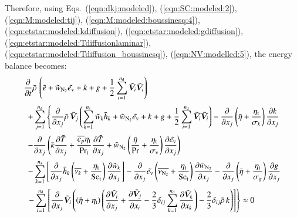 \documentclass{warpdoc}
\newcommand{\alb}{\vspace{0.2cm}\\} %
\newcommand{\Cp}{{c_{p}}}
\newcommand{\Sct}{{{\rm Sc}_{\rm t}}}
\newcommand{\Prt}{{{\rm Pr}_{\rm t}}}
\newcommand{\nd}{{{n}_{\rm d}}}
\newcommand{\ns}{{{n}_{\rm s}}}
\newcommand{\turb}{_{\rm t}}
\newcommand{\etat}{{\eta\turb}}
\newcommand{\mfd}{\displaystyle}
\newcommand{\ev}{e_{\rm v}}
\newcommand{\sigmav}{\sigma_{\rm v}}
\begin{document}
Therefore, using Eqs.\ (\ref{eqn:dkj:modeled}), (\ref{eqn:SC:modeled:2}),
(\ref{eqn:M:modeled:tij}), (\ref{eqn:M:modeled:boussinesq:4}), (\ref{eqn:etstar:modeled:kdiffusion}),
(\ref{eqn:etstar:modeled:gdiffusion}), (\ref{eqn:etstar:modeled:Tdiffusionlaminar}),
(\ref{eqn:etstar:modeled:Tdiffusion_boussinesq}), (\ref{eqn:NV:modelled:5}),  the energy balance becomes:
%
\begin{equation}
 \begin{array}{l}
    \mfd\frac{\partial}{\partial t}  \wbar{\rho}\,
       \left(  \wtilde{e}
           + {\wtilde{w}_{\rm N_2}}\wtilde{\ev}
           + k + g
           + \frac{1}{2}\sum_{i=1}^{\nd}  {\wtilde{\bm{V}}_i}  {\wtilde{\bm{V}}_i}
       \right)\alb\mfd~~
     + \sum_{j=1}^{\nd} \left\{ \frac{\partial}{\partial x_j} \wbar{\rho}\, {\wtilde{\bm{V}}_j}
       \left(
            \sum_{k=1}^{\ns} {\wtilde{w}_k}  {\wtilde{h}_k}
          + {\wtilde{w}_{\rm N_2}}\wtilde{\ev}
          + k + g
          + \frac{1}{2}\sum_{i=1}^{\nd} {\wtilde{\bm{V}}_i}  {\wtilde{\bm{V}}_i}
       \right)        -\frac{\partial }{\partial x_j} \left( \wbar{\eta}+\frac{\etat}{\sigma_k} \right) \frac{\partial k}{\partial x_j}
 \right.\alb
~~    \mfd - \frac{\partial }{\partial x_j} \left(
       \wbar{\kappa} \frac{\partial \wtilde{T}}{\partial x_j}
       +\frac{\overline{\Cp} \etat}{\Prt} \frac{\partial \wtilde{T}}{\partial x_j}
       + {\wtilde{w}_{\rm N_2}} \left( \frac{\wbar{\eta}}{\Pr}+\frac{ \etat}{\sigmav} \right) \frac{\partial \wtilde{\ev}}{\partial x_j}
       \right)\alb
  ~~  \mfd - \sum_{k=1}^{\ns}
       \left[
         \frac{\partial }{\partial x_j} {\wtilde{h}_k} \left(
              \overline{\nu_k}
             +\frac{\etat}{\Sct} \right) \frac{\partial {\wtilde{w}_k}}{\partial x_j}
       \right]- \frac{\partial }{\partial x_j} \wtilde{\ev} \left( \overline{\nu_{\rm N_2}}+ \frac{\etat}{\Sct} \right) \frac{\partial {\wtilde{w}_{\rm N_2}}}{\partial x_j}
        -\frac{\partial }{\partial x_j}
            \left( \wbar{\eta}+\frac{\etat}{\sigma_g} \right) \frac{\partial g}{\partial x_j}
        \alb
    ~~\mfd \left.  - \sum_{i=1}^{\nd}
       \left[
         \frac{\partial }{\partial x_j} {\wtilde{\bm{V}}_i} \left(
            \left(\wbar{\eta}+\etat\right) \left(
               \frac{\partial {\wtilde{\bm{V}}_i}}{\partial x_j}
               +\frac{\partial {\wtilde{\bm{V}}_j}}{\partial x_i}
               -\frac{2}{3} \delta_{ij} \sum_{k=1}^\nd \frac{\partial {\wtilde{\bm{V}}_k}}{\partial x_k}
            \right)
            - \frac{2}{3} \delta_{ij} \wbar{\rho}\, k
         \right)
       \right]
      \right\} \approx 0
 \end{array}
 \label{eqn:etstar:modeled:2}
\end{equation}
\end{document}
